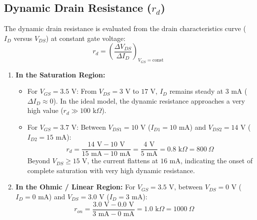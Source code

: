 \documentclass[12pt,a4paper]{article}
\begin{document}
\subsection{Dynamic Drain Resistance ($r_d$)}
The dynamic drain resistance is evaluated from the drain characteristics curve ($I_D$ versus $V_{DS}$) at constant gate voltage:
\begin{equation}
    r_d = \left( \frac{\Delta V_{DS}}{\Delta I_D} \right)_{V_{GS} = \text{const}}
\end{equation}
\begin{enumerate}
    \item \textbf{In the Saturation Region:}
    \begin{itemize}
        \item For $V_{GS} = 3.5\text{ V}$: From $V_{DS} = 3\text{ V}$ to $17\text{ V}$, $I_D$ remains steady at $3\text{ mA}$ ($\Delta I_D \approx 0$). In the ideal model, the dynamic resistance approaches a very high value ($r_d \gg 100\text{ k}\Omega$).
        \item For $V_{GS} = 3.7\text{ V}$: Between $V_{DS1} = 10\text{ V}$ ($I_{D1} = 10\text{ mA}$) and $V_{DS2} = 14\text{ V}$ ($I_{D2} = 15\text{ mA}$):
        \begin{equation}
            r_d = \frac{14\text{ V} - 10\text{ V}}{15\text{ mA} - 10\text{ mA}} = \frac{4\text{ V}}{5\text{ mA}} = 0.8\text{ k}\Omega = 800\ \Omega
        \end{equation}
        Beyond $V_{DS} \ge 15\text{ V}$, the current flattens at $16\text{ mA}$, indicating the onset of complete saturation with very high dynamic resistance.
    \end{itemize}
    \item \textbf{In the Ohmic / Linear Region:}
    For $V_{GS} = 3.5\text{ V}$, between $V_{DS} = 0\text{ V}$ ($I_D = 0\text{ mA}$) and $V_{DS} = 3.0\text{ V}$ ($I_D = 3\text{ mA}$):
    \begin{equation}
        r_{on} = \frac{3.0\text{ V} - 0.0\text{ V}}{3\text{ mA} - 0\text{ mA}} = 1.0\text{ k}\Omega = 1000\ \Omega
    \end{equation}
\end{enumerate}
\end{document}
